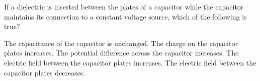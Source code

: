 \begin{questions}\setcounter{question}{13}\question
If a dielectric is inserted between the plates of a capacitor while the capacitor maintains its connection to a constant voltage source, which of the following is true?

\begin{choices}
\choice The capacitance of the capacitor is unchanged.
\choice The charge on the capacitor plates increases.
\choice The potential difference across the capacitor increases.
\choice The electric field between the capacitor plates increases.
\choice The electric field between the capacitor plates decreases.
\end{choices}\end{questions}

